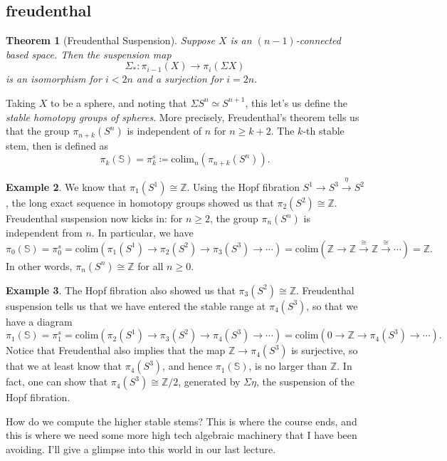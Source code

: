 \documentclass[10pt]{amsart}
\newtheorem{thm}{Theorem}[section]
\theoremstyle{definition}
\newtheorem{ex}[thm]{Example}
\newcommand{\cdef}[1]{\textcolor{Bittersweet}{#1}}
\begin{document}
\subsection{freudenthal}
\begin{thm}[Freudenthal Suspension]
    Suppose $X$ is an $(n-1)$-connected based space. Then the suspension map
    \[\Sigma_*:\pi_{i-1}(X) \to \pi_i(\Sigma X)\]
    is an isomorphism for $i <2n$ and a surjection for $i=2n$.
\end{thm}

Taking $X$ to be a sphere, and noting that $\Sigma S^n \simeq S^{n+1}$, this let's us define the \cdef{\emph{stable homotopy groups of spheres}}. More precisely, Freudenthal's theorem tells us that the group $\pi_{n+k}(S^n)$ is independent of $n$ for $n \geq k+2$. The $k$-th stable stem, then is defined as
\[\pi_k(\mathbb{S}) =\pi_k^s \coloneq \text{colim}_n(\pi_{n+k}(S^n)).\]

\begin{ex}
    We know that $\pi_1(S^1) \cong \mathbb{Z}$. Using the Hopf fibration $S^1 \to S^3 \xrightarrow{\eta} S^2$, the long exact sequence in homotopy groups showed us that $\pi_2(S^2) \cong \mathbb{Z}$. Freudenthal suspension now kicks in: for $n \geq 2$, the group $\pi_n(S^n)$ is independent from $n$. In particular, we have
    \[\pi_0(\mathbb{S}) = \pi_0^s = \text{colim}(\pi_1(S^1) \to \pi_2(S^2) \to \pi_3(S^3) \to \cdots) = \text{colim}(\mathbb{Z} \to \mathbb{Z} \xrightarrow{\cong}\mathbb{Z} \xrightarrow{\cong} \cdots) = \mathbb{Z}.\]
    In other words, $\pi_n(S^n) \cong \mathbb{Z}$ for all $n \geq 0$.
\end{ex}

\begin{ex}
    The Hopf fibration also showed us that $\pi_3(S^2) \cong \mathbb{Z}$. Freudenthal suspension tells us that we have entered the stable range at $\pi_4(S^3)$, so that we have a diagram
    \[\pi_1(\mathbb{S}) = \pi_1^s = \text{colim}(\pi_2(S^1) \to \pi_3(S^2) \to \pi_4(S^3) \to \cdots) = \text{colim}(0 \to \mathbb{Z} \to \pi_4(S^3) \to \cdots).\]
    Notice that Freudenthal also implies that the map $\mathbb{Z} \to \pi_4(S^3)$ is surjective, so that we at least know that $\pi_4(S^3)$, and hence $\pi_1(\mathbb{S})$, is no larger than $\mathbb{Z}$. In fact, one can show that $\pi_4(S^3) \cong \mathbb{Z}/2$, generated by $\Sigma\eta$, the suspension of the Hopf fibration.
\end{ex}

How do we compute the higher stable stems? This is where the course ends, and this is where we need some more high tech algebraic machinery that I have been avoiding. I'll give a glimpse into this world in our last lecture.
\end{document}
